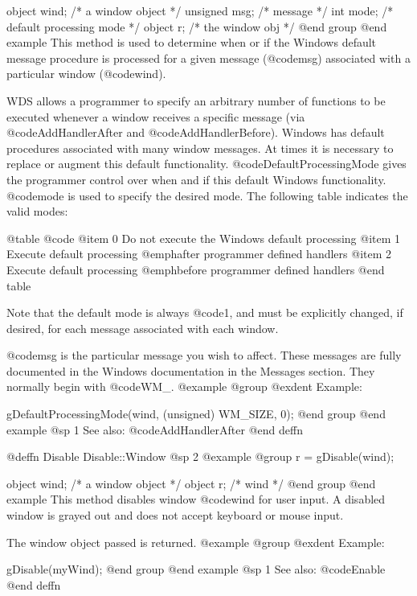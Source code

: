 object   wind;     /*  a window object          */
unsigned msg;      /*  message                  */
int      mode;     /*  default processing mode  */
object   r;        /*  the window obj           */
@end group
@end example
This method is used to determine when or if the Windows default message
procedure is processed for a given message (@code{msg}) associated with
a particular window (@code{wind}).

WDS allows a programmer to specify an arbitrary number of functions
to be executed whenever a window receives a specific message (via
@code{AddHandlerAfter} and @code{AddHandlerBefore}).  Windows has
default procedures associated with many window messages.  At times
it is necessary to replace or augment this default functionality.
@code{DefaultProcessingMode} gives the programmer control over when and
if this default Windows functionality.  @code{mode} is used to specify
the desired mode.  The following table indicates the valid modes:

@table @code
@item 0
Do not execute the Windows default processing
@item 1
Execute default processing @emph{after} programmer defined handlers
@item 2
Execute default processing @emph{before} programmer defined handlers
@end table

Note that the default mode is always @code{1}, and must be explicitly
changed, if desired, for each message associated with each window.

@code{msg} is the particular message you wish to affect.  These messages
are fully documented in the Windows documentation in the Messages
section.  They normally begin with @code{WM_}.
@example
@group
@exdent Example:

gDefaultProcessingMode(wind, (unsigned) WM_SIZE, 0);
@end group
@end example
@sp 1
See also:  @code{AddHandlerAfter}
@end deffn








@deffn {Disable} Disable::Window
@sp 2
@example
@group
r = gDisable(wind);

object  wind;   /*  a window object  */
object  r;      /*  wind             */
@end group
@end example
This method disables window @code{wind} for user input.  A
disabled window is grayed out and does not accept keyboard or
mouse input.

The window object passed is returned.
@example
@group
@exdent Example:

gDisable(myWind);
@end group
@end example
@sp 1
See also:  @code{Enable}
@end deffn




